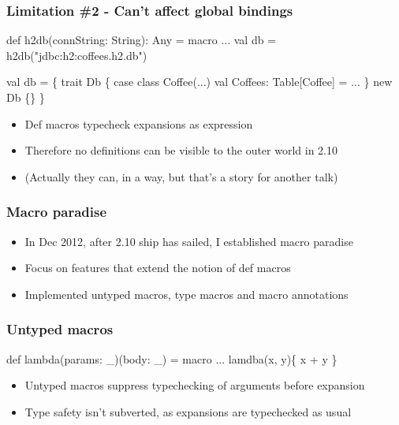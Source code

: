\documentclass[svgnames,hyperref={bookmarks=false}]{beamer}
\begin{document}
\begin{frame}[fragile]
\frametitle{Limitation \#2 - Can't affect global bindings}

\begin{semiverbatim}
\alert{def h2db(connString: String): Any = macro ...}
val db = \alert{h2db(}"jdbc:h2:coffees.h2.db"\alert{)}

val db = \{
  trait Db \{
    case class Coffee(...)
    val Coffees: Table[Coffee] = ...
  \}
  new Db \{\}
\}

\end{semiverbatim}

\begin{itemize}
\item Def macros typecheck expansions as expression
\item Therefore no definitions can be visible to the outer world in 2.10
\item (Actually they can, in a way, but that's a story for another talk)
\end{itemize}
\end{frame}

\begin{frame}[fragile]
\frametitle{Macro paradise}

\begin{itemize}
\item In Dec 2012, after 2.10 ship has sailed, I established macro paradise
\item Focus on features that extend the notion of def macros
\item Implemented untyped macros, type macros and macro annotations
\end{itemize}
\end{frame}

\begin{frame}[fragile]
\frametitle{Untyped macros}

\begin{semiverbatim}
\alert{def lambda(params: _)(body: _) = macro ...}
\alert{lamdba(x, y)\{} x + y \alert{\}}

\end{semiverbatim}

\begin{itemize}
\item Untyped macros suppress typechecking of arguments before expansion
\item Type safety isn't subverted, as expansions are typechecked as usual
\end{itemize}
\end{frame}
\end{document}

